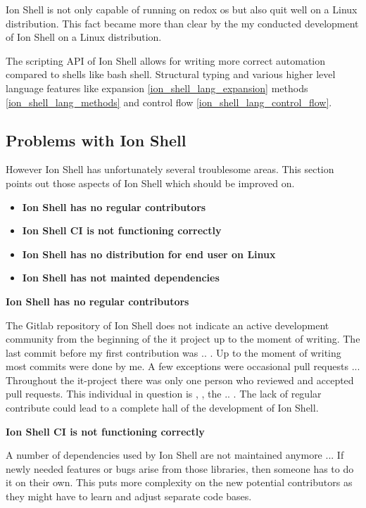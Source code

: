 Ion Shell is not only capable of running on redox os but also quit well on a Linux distribution.
This fact became more than clear by the my conducted development of Ion Shell on a Linux distribution.

The scripting API of Ion Shell allows for writing more correct automation compared to shells like bash shell.
Structural typing and various higher level language features like expansion \ref{ion_shell_lang_expansion} methods \ref{ion_shell_lang_methods} and control flow \ref{ion_shell_lang_control_flow}.

\subsection{Problems with Ion Shell}

However Ion Shell has unfortunately several troublesome areas.
This section points out those aspects of Ion Shell which should be improved on.

\newcommand{\itemIonShellRegularContributor}{\textbf{Ion Shell has no regular contributors}}
\newcommand{\itemIonShellCI}{\textbf{}
	\textbf{Ion Shell has not mainted dependencies}
}
\newcommand{\itemIonShellDistribution}{
	\textbf{Ion Shell has no distribution for end user on Linux}
}
\newcommand{\itemIonShellDependencies}{\textbf{Ion Shell CI is not functioning correctly}}

\begin{itemize}
	\item \itemIonShellRegularContributor
	\item \itemIonShellDependencies
	\item \itemIonShellDistribution
	\item \itemIonShellCI
\end{itemize}


\itemIonShellRegularContributor

The Gitlab repository of Ion Shell does not indicate an active development community
from the beginning of the it project up to the moment of writing.
The last commit before my first contribution was .. .
Up to the moment of writing most commits were done by me.
A few exceptions were occasional pull requests ...
Throughout the it-project there was only one person who reviewed and accepted pull requests.
This individual in question is , , the .. .
The lack of regular contribute could lead to a complete hall of the development of Ion Shell.

\itemIonShellDependencies

A number of dependencies used by Ion Shell are not maintained anymore ...
If newly needed features or bugs arise from those libraries, then someone has to do it on their own.
This puts more complexity on the new potential contributors as they might have to learn and adjust separate code bases.

